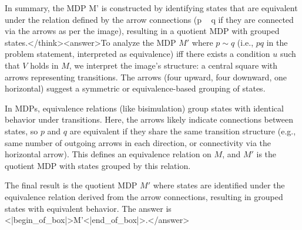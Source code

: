 In summary, the MDP M' is constructed by identifying states that are equivalent under the relation defined by the arrow connections (p ~ q if they are connected via the arrows as per the image), resulting in a quotient MDP with grouped states.</think><answer>To analyze the MDP \( M' \) where \( p \sim q \) (i.e., \( p q \) in the problem statement, interpreted as equivalence) iff there exists a condition \( u \) such that \( V \) holds in \( M \), we interpret the image’s structure: a central square with arrows representing transitions. The arrows (four upward, four downward, one horizontal) suggest a symmetric or equivalence-based grouping of states.  

In MDPs, equivalence relations (like bisimulation) group states with identical behavior under transitions. Here, the arrows likely indicate connections between states, so \( p \) and \( q \) are equivalent if they share the same transition structure (e.g., same number of outgoing arrows in each direction, or connectivity via the horizontal arrow). This defines an equivalence relation on \( M \), and \( M' \) is the quotient MDP with states grouped by this relation.  

The final result is the quotient MDP \( M' \) where states are identified under the equivalence relation derived from the arrow connections, resulting in grouped states with equivalent behavior.  
The answer is <|begin_of_box|>M'<|end_of_box|>.</answer>